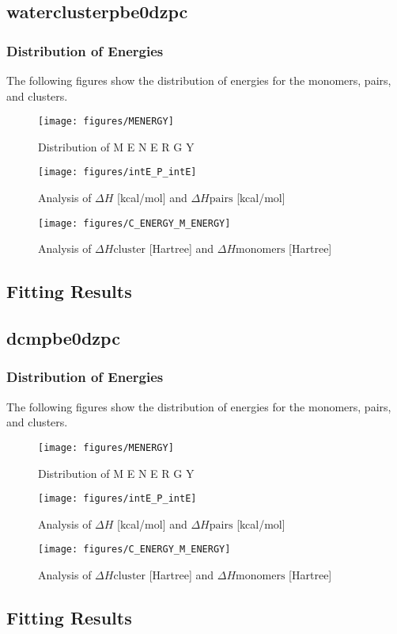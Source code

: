 \documentclass[journal=jacsat,manuscript=article]{achemso}
\begin{document}
\subsection{waterclusterpbe0dzpc}
\subsubsection{Distribution of Energies} 
 The following figures show the distribution of energies for the monomers, pairs, and clusters.

\begin{figure}
    \centering
    \texttt{[image: figures/MENERGY]}
    \caption{ Distribution of  M E N E R G Y }
    \label{fig:singlekey}
\end{figure}

\begin{figure}
    \centering
    \texttt{[image: figures/intE\_P\_intE]}
    \caption{ Analysis of $\Delta H$ [kcal/mol] and $\Delta H{\mathrm{pairs}}$ [kcal/mol] }
    \label{fig:_intE_P_intE}
\end{figure}

\begin{figure}
    \centering
    \texttt{[image: figures/C\_ENERGY\_M\_ENERGY]}
    \caption{ Analysis of $\Delta H{\mathrm{cluster}}$ [Hartree] and $\Delta H{\mathrm{monomers}}$ [Hartree] }
    \label{fig:_C_ENERGY_M_ENERGY}
\end{figure}
\newpage 
 \subsection{Fitting Results}
\subsection{dcmpbe0dzpc}
\subsubsection{Distribution of Energies} 
 The following figures show the distribution of energies for the monomers, pairs, and clusters.

\begin{figure}
    \centering
    \texttt{[image: figures/MENERGY]}
    \caption{ Distribution of  M E N E R G Y }
    \label{fig:singlekey}
\end{figure}

\begin{figure}
    \centering
    \texttt{[image: figures/intE\_P\_intE]}
    \caption{ Analysis of $\Delta H$ [kcal/mol] and $\Delta H{\mathrm{pairs}}$ [kcal/mol] }
    \label{fig:_intE_P_intE}
\end{figure}

\begin{figure}
    \centering
    \texttt{[image: figures/C\_ENERGY\_M\_ENERGY]}
    \caption{ Analysis of $\Delta H{\mathrm{cluster}}$ [Hartree] and $\Delta H{\mathrm{monomers}}$ [Hartree] }
    \label{fig:_C_ENERGY_M_ENERGY}
\end{figure}
\newpage 
 \subsection{Fitting Results}
\end{document}
